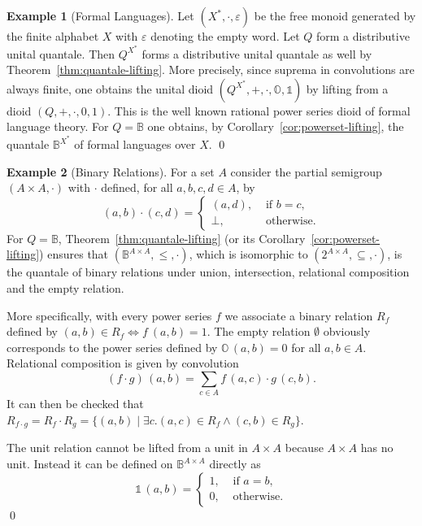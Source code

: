 \documentclass[12pt]{article}
\newcommand{\Al}{X}
\theoremstyle{definition}
\newtheorem{example}{Example}
\newcommand{\unit}{\mathbb{1}}
\newcommand{\zero}{\mathbb{O}}
\begin{document}
\begin{example}[Formal Languages]\label{ex:formal-languages}
  Let $(\Al^\ast,\cdot,\varepsilon)$ be the free monoid generated by
  the finite alphabet $\Al$ with $\varepsilon$ denoting the empty
  word. Let $Q$ form a distributive unital quantale. Then
  $Q^{\Al^\ast}$ forms a distributive unital quantale as well by
  Theorem~\ref{thm:quantale-lifting}. More precisely, since suprema in
  convolutions are always finite, one obtains the unital dioid
  $(Q^{\Al^\ast},+,\cdot,\zero,\unit)$ by lifting from a dioid
  $(Q,+,\cdot,0,1)$. This is the well known rational power series
  dioid of formal language theory. For $Q=\mathbb{B}$ one obtains, by
  Corollary~\ref{cor:powerset-lifting}, the quantale
  $\mathbb{B}^{\Al^\ast}$ of formal languages over $\Al$. \qed
\end{example}

\begin{example}[Binary Relations]\label{ex:binary-relations}
  For a set $A$ consider the partial semigroup $(A\times A,\cdot)$
  with $\cdot$ defined, for all $a,b,c,d\in A$, by
  \begin{equation*}
    (a,b)\cdot
  (c,d)=
  \begin{cases}
    (a,d), & \text{ if } b=c,\\
    \bot, & \text{ otherwise}.
  \end{cases}
\end{equation*}
For $Q=\mathbb{B}$, Theorem~\ref{thm:quantale-lifting} (or its
Corollary~\ref{cor:powerset-lifting}) ensures that
$(\mathbb{B}^{A\times A},\le,\cdot)$, which is isomorphic to
$(2^{A\times A},\subseteq,\cdot)$, is the quantale of binary relations
under union, intersection, relational composition and the empty
relation.

More specifically, with every power series $f$ we associate a binary
relation $R_f$ defined by $(a,b)\in R_f \Leftrightarrow f\
(a,b)=1$. The empty relation $\emptyset$ obviously corresponds to the
power series defined by $\zero\, (a,b) = 0$ for all $a,b\in A$. Relational
composition is given by convolution
\begin{equation*}
  (f\cdot g)\, (a,b)=\sum_{c\in A} f\, (a,c)\cdot g\, (c,b).
\end{equation*}
It can then be checked  that $R_{f\cdot g}=R_f\cdot R_g=\{(a,b)
\mid \exists c. (a,c) \in R_f\wedge (c,b)\in R_g\}$.

The unit relation cannot be lifted from a unit in $A\times A$ because
$A\times A$ has no unit. Instead it can be defined on
$\mathbb{B}^{A\times A}$ directly as
\begin{equation*}
  \unit\, (a,b) = 
  \begin{cases}
    1, &\text{ if } a=b,\\
    0, &\text{ otherwise}.
  \end{cases}
\end{equation*}
\qed
\end{example}
\end{document}
